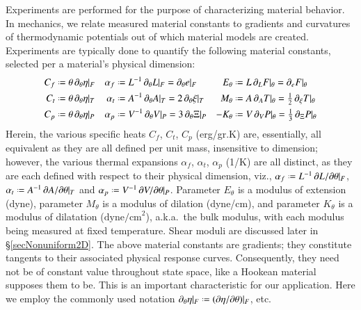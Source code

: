 Experiments are performed for the purpose of characterizing material behavior.  In mechanics, we relate measured material constants to gradients and curvatures of thermo\-dynamic potentials out of which material models are created.  Experiments are typically done to quantify the following material constants, selected per a material's physical dimension:
\begin{subequations}
\label{materialConstants}
\begin{align}
C_f & \defeq \theta \, \partial_{\theta} \eta |_F & 
\alpha_f & \defeq L^{-1} \, \partial_{\theta} L |_F = 
\partial_{\theta} e |_F &
E_{\theta} & \defeq L \, \partial_L F |_{\theta} = 
\partial_e F |_{\theta} \\
C_t & \defeq \theta \, \partial_{\theta} \eta |_T & 
\alpha_t & \defeq A^{-1} \, \partial_{\theta} A |_T = 
2 \, \partial_{\theta} \xi |_T &
M_{\theta} & \defeq A \, \partial_A T |_{\theta} = 
\tfrac{1}{2} \, \partial_{\xi} T |_{\theta} \\
C_p & \defeq \theta \, \partial_{\theta} \eta |_P & 
\alpha_p & \defeq V^{-1} \, \partial_{\theta} V |_P = 
3 \, \partial_{\theta} \Xi |_P &
-K_{\theta} & \defeq V \, \partial_V P |_{\theta} = 
\tfrac{1}{3} \, \partial_{\Xi} P |_{\theta}
\end{align}
\end{subequations}
Herein, the various specific heats $C_f$, $C_t$, $C_p$ (erg/gr.K) are, essentially,  all equivalent as they are all defined per unit mass, insensitive to dimension; however, the various thermal expansions $\alpha_f$, $\alpha_t$, $\alpha_p$ (1/K) are all distinct, as they are each defined with respect to their physical dimension, viz., $\alpha_f \defeq L^{-1} \, \partial L / \partial \theta |_F$, $\alpha_t \defeq A^{-1} \, \partial A / \partial \theta |_T$ and $\alpha_p \defeq V^{-1} \, \partial V / \partial \theta |_P$.  Parameter $E_{\theta}$ is a modulus of extension (dyne), parameter $M_{\theta}$ is a modulus of dilation (dyne/cm), and parameter $K_{\theta}$ is a modulus of dilatation ($\mathrm{dyne/cm}^2$), a.k.a.\ the bulk modulus, with each modulus being measured at fixed temperature.  Shear moduli are discussed later in \S\ref{secNonuniform2D}.  The above material constants are gradients; they constitute tangents to their associated physical response curves.  Consequently, they need not be of constant value throughout state space, like a Hookean material supposes them to be.  This is an important characteristic for our application.  Here we employ the commonly used notation $\partial_{\theta} \eta |_F \defeq ( \partial \eta / \partial \theta ) |_F$, etc.


